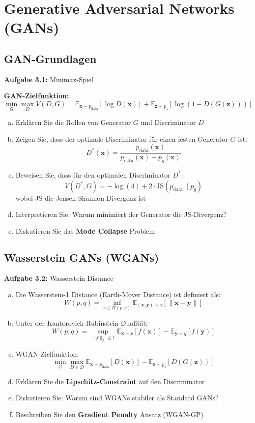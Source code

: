 \documentclass[12pt,a4paper]{article}
\begin{document}
\section{Generative Adversarial Networks (GANs)}

\subsection{GAN-Grundlagen}

\textbf{Aufgabe 3.1:} Minimax-Spiel

\textbf{GAN-Zielfunktion:}
\begin{equation}
\min_G \max_D V(D, G) = \mathbb{E}_{\mathbf{x} \sim p_{\text{data}}}[\log D(\mathbf{x})] + \mathbb{E}_{\mathbf{z} \sim p_z}[\log(1 - D(G(\mathbf{z})))]
\end{equation}

\begin{enumerate}[(a)]
    \item Erklären Sie die Rollen von Generator $G$ und Discriminator $D$
    \item Zeigen Sie, dass der optimale Discriminator für einen festen Generator $G$ ist:
    $$D^*(\mathbf{x}) = \frac{p_{\text{data}}(\mathbf{x})}{p_{\text{data}}(\mathbf{x}) + p_g(\mathbf{x})}$$
    \item Beweisen Sie, dass für den optimalen Discriminator $D^*$:
    $$V(D^*, G) = -\log(4) + 2 \cdot \text{JS}(p_{\text{data}} \| p_g)$$
    wobei JS die Jensen-Shannon Divergenz ist
    \item Interpretieren Sie: Warum minimiert der Generator die JS-Divergenz?
    \item Diskutieren Sie das \textbf{Mode Collapse} Problem
\end{enumerate}

\subsection{Wasserstein GANs (WGANs)}

\textbf{Aufgabe 3.2:} Wasserstein Distance

\begin{enumerate}[(a)]
    \item Die Wasserstein-1 Distance (Earth-Mover Distance) ist definiert als:
    $$W(p, q) = \inf_{\gamma \in \Pi(p,q)} \mathbb{E}_{(\mathbf{x}, \mathbf{y}) \sim \gamma}[\|\mathbf{x} - \mathbf{y}\|]$$
    \item Unter der Kantorovich-Rubinstein Dualität:
    $$W(p, q) = \sup_{\|f\|_L \leq 1} \mathbb{E}_{\mathbf{x} \sim p}[f(\mathbf{x})] - \mathbb{E}_{\mathbf{y} \sim q}[f(\mathbf{y})]$$
    \item WGAN-Zielfunktion:
    $$\min_G \max_{D \in \mathcal{D}} \mathbb{E}_{\mathbf{x} \sim p_{\text{data}}}[D(\mathbf{x})] - \mathbb{E}_{\mathbf{z} \sim p_z}[D(G(\mathbf{z}))]$$
    \item Erklären Sie die \textbf{Lipschitz-Constraint} auf den Discriminator
    \item Diskutieren Sie: Warum sind WGANs stabiler als Standard GANs?
    \item Beschreiben Sie den \textbf{Gradient Penalty} Ansatz (WGAN-GP)
\end{enumerate}
\end{document}
